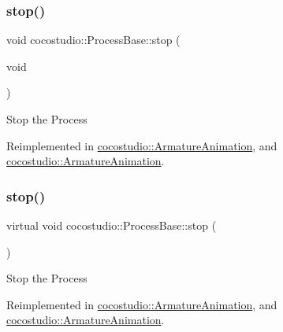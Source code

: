 \subsubsection{\texorpdfstring{stop()}{stop()}\hspace{0.1cm}{\footnotesize\ttfamily [1/2]}}
{\footnotesize\ttfamily void cocostudio\+::\+Process\+Base\+::stop (\begin{DoxyParamCaption}\item[{void}]{ }\end{DoxyParamCaption})\hspace{0.3cm}{\ttfamily [virtual]}}

Stop the Process 

Reimplemented in \hyperlink{classcocostudio_1_1ArmatureAnimation_ae02f5a30490aa9782b52f89e27470128}{cocostudio\+::\+Armature\+Animation}, and \hyperlink{classcocostudio_1_1ArmatureAnimation_a4fed052a2b06d6ff7959d5e86c73044c}{cocostudio\+::\+Armature\+Animation}.

\mbox{\label{classcocostudio_1_1ProcessBase_a7e4cb3dd6ab91ba5a9db51594d1e613a}} 
\subsubsection{\texorpdfstring{stop()}{stop()}\hspace{0.1cm}{\footnotesize\ttfamily [2/2]}}
{\footnotesize\ttfamily virtual void cocostudio\+::\+Process\+Base\+::stop (\begin{DoxyParamCaption}{ }\end{DoxyParamCaption})\hspace{0.3cm}{\ttfamily [virtual]}}

Stop the Process 

Reimplemented in \hyperlink{classcocostudio_1_1ArmatureAnimation_ae02f5a30490aa9782b52f89e27470128}{cocostudio\+::\+Armature\+Animation}, and \hyperlink{classcocostudio_1_1ArmatureAnimation_a4fed052a2b06d6ff7959d5e86c73044c}{cocostudio\+::\+Armature\+Animation}.

\mbox{\label{classcocostudio_1_1ProcessBase_acd596d27542d92de41e3435add6f7399}} 
